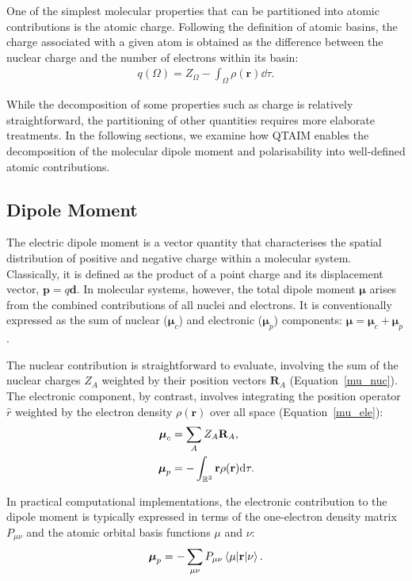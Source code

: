 \newpage

One of the simplest molecular properties that can be partitioned into atomic
contributions is the atomic charge. Following the definition of atomic basins,
the charge associated with a given atom is obtained as the difference between
the nuclear charge and the number of electrons within its basin:
%
\begin{align}
  q(\Omega) = Z_\Omega - \int_{\Omega} \rho(\mathbf{r}) \dd\tau.
  \label{q_qtaim}
\end{align}

While the decomposition of some properties such as charge is relatively
straightforward, the partitioning of other quantities requires more
elaborate treatments. In the following sections, we examine how QTAIM enables
the decomposition of the molecular dipole moment and polarisability into
well-defined atomic contributions.

\subsection{Dipole Moment}

The electric dipole moment is a vector quantity that characterises the spatial
distribution of positive and negative charge within a molecular system.
Classically, it is defined as the product of a point charge and its
displacement vector, $\mathbf{p} = q \mathbf{d}$. In molecular systems, however, the
total dipole moment $\boldsymbol{\mu}$ arises from the combined contributions of all
nuclei and electrons. It is conventionally expressed as the sum of nuclear
($\boldsymbol{\mu}_c$) and electronic ($\boldsymbol{\mu}_p$) components:
$\boldsymbol{\mu} = \boldsymbol{\mu}_c + \boldsymbol{\mu}_p$.

The nuclear contribution is straightforward to evaluate, involving the sum of
the nuclear charges $Z_A$ weighted by their position vectors $\mathbf{R}_A$
(Equation~\ref{mu_nuc}). The electronic component, by contrast, involves
integrating the position operator $\hat{r}$ weighted by the electron density
$\rho(\mathbf{r})$ over all space (Equation~\ref{mu_ele}):
%
\begin{align}
  \boldsymbol{\mu}_c &= \sum_A Z_A \mathbf{R}_A,
    \label{mu_nuc} \\
  \boldsymbol{\mu}_p &= - \int_{\rreal[3]} \mathbf{r} \rho(\mathbf{r}) \dd\tau.
    \label{mu_ele}
\end{align}

\pagebreak
In practical computational implementations, the electronic contribution to the
dipole moment is typically expressed in terms of the one-electron density
matrix $P_{\mu\nu}$ and the atomic orbital basis functions $\mu$ and $\nu$:
%
\begin{align}
  \boldsymbol{\mu}_p = -\sum_{\mu\nu} P_{\mu\nu} \matrixel{\mu}{\mathbf{r}}{\nu}.
\end{align}


